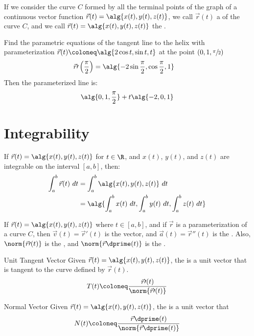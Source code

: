 \documentclass[math]{amznotes}
\begin{document}
If we consider the curve $C$ formed by all the terminal points of the graph of a continuous vector function $\vec{r}(t) = \alg{x(t), y(t), z(t)}$, we call $\vec{r}(t)$ a  of the curve $C$, and we call $\vec{r}(t) = \alg{x(t), y(t), z(t)}$ the .

\begin{exbox}{}{}
    Find the parametric equations of the tangent line to the helix with parameterization $\vec{r}(t) \coloneq \alg{2 \cos t, \sin t, t}$ at the point $(0,1,\sfrac{\pi}{2})$
    \tcblower
    \begin{align*}
        \vec{r}\prime \left( \frac{\pi}{2} \right)
        &= \alg{-2 \sin \frac{\pi}{2}, \cos \frac{\pi}{2}, 1}
    \end{align*}
    Then the parameterized line is:
    \[ \alg{0,1,\frac{\pi}{2}} + t\alg{-2,0,1} \]
\end{exbox}

\section{Integrability}

If $\vec{r}(t) = \alg{x(t), y(t), z(t)}$ for $t \in \R$, and $x(t)$, $y(t)$, and $z(t)$ are integrable on the interval $[a,b]$, then:
\begin{align*}
     \int_a^b \vec{r}(t)\ dt
     &= \int_a^b \alg{x(t), y(t), z(t)}\ dt \\
     &= \alg{ \int_a^b x(t)\ dt, \int_a^b y(t)\ dt, \int_a^b z(t)\ dt}
\end{align*}

If $\vec{r}(t) = \alg{x(t), y(t), z(t)}$ where $t \in [a,b]$, and if $\vec{r}$ is a parameterization of a curve $C$, then $\vec{v}(t) = \vec{r}\prime(t)$ is the  vector, and $\vec{a}(t) = \vec{r}\dprime (t)$ is the . Also, $\norm{ \vec{r}\prime(t) }$ is the , and $\norm{ \vec{r}\dprime(t) }$ is the .

\begin{dfnbox}{Unit Tangent Vector}{}
    Given $\vec{r}(t) = \alg{x(t), y(t), z(t)}$, the  is a unit vector that is tangent to the curve defined by $\vec{r}(t)$.
    \tcblower
    \[ T(t) \coloneq \frac{\vec{r}\prime(t)}{\norm{ \vec{r}\prime(t) }} \]
\end{dfnbox}

\begin{dfnbox}{Normal Vector}{}
    Given $\vec{r}(t) = \alg{x(t), y(t), z(t)}$, the  is a unit vector that
    \tcblower
    \[ N(t) \coloneq  \frac{\vec{r}\dprime(t)}{\norm{ \vec{r}\dprime(t)} } \]
\end{dfnbox}
\end{document}
